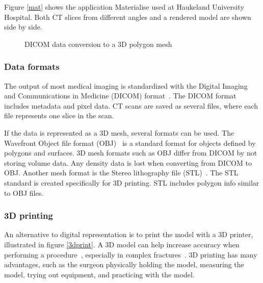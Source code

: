\documentclass[a4paper]{report}
\begin{document}
Figure \ref{mat} shows the application Materialise used at Haukeland University Hospital. Both CT slices from different angles and a rendered model are shown side by side.

\begin{figure}[h!]
    \centering
	\hfill
  \caption{DICOM data conversion to a 3D polygon mesh}
  \label{dicom}
\end{figure}

\subsubsection{Data formats}

The output of most medical imaging is standardized with the Digital Imaging and Communications in Medicine (DICOM) format~\cite{noauthor_dicom_nodate}. The DICOM format includes metadata and pixel data. CT scans are saved as several files, where each file represents one slice in the scan.

If the data is represented as a 3D mesh, several formats can be used. The Wavefront Object file format (OBJ)~\cite{obj_wavefront_nodate} is a standard format for objects defined by polygons and surfaces. 3D mesh formats such as OBJ differ from DICOM by not storing volume data. Any density data is lost when converting from DICOM to OBJ.
Another mesh format is the Stereo lithography file (STL)~\cite{noauthor_stl_2019}. The STL standard is created specifically for 3D printing. STL includes polygon info similar to OBJ files.

\subsubsection{ 3D printing }

An alternative to digital representation is to print the model with a 3D printer, illustrated in figure \ref{3dprint}. A 3D model can help increase accuracy when performing a procedure~\cite{shahrubudin_overview_2019}, especially in complex fractures~\cite{chen_efficacy_2019}. 
3D printing has many advantages, such as the surgeon physically holding the model, measuring the model, trying out equipment, and practicing with the model.
\end{document}
